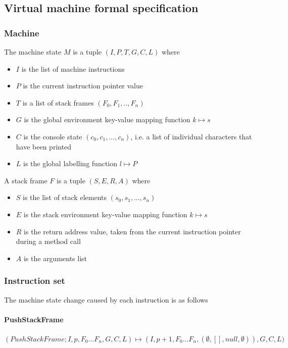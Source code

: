 \subsection{Virtual machine formal specification}

\subsubsection{Machine}

The machine state $M$ is a tuple $(I, P, T, G, C, L)$ where
\begin{itemize}
\item $I$ is the list of machine instructions
\item $P$ is the current instruction pointer value
\item $T$ is a list of stack frames $(F_0, F_1, .., F_n)$
\item $G$ is the global environment key-value mapping function $k \mapsto s$
\item $C$ is the console state $(c_0, c_1, ..., c_n)$, i.e. a list of individual characters that have been printed
\item $L$ is the global labelling function $l \mapsto P$
\end{itemize}

A stack frame $F$ is a tuple $(S, E, R, A)$ where
\begin{itemize}
\item $S$ is the list of stack elements $(s_0, s_1, ..., s_n)$
\item $E$ is the stack environment key-value mapping function $k \mapsto s$
\item $R$ is the return address value, taken from the current instruction pointer during a method call
\item $A$ is the arguments list
\end{itemize}

\subsubsection{Instruction set}

The machine state change caused by each instruction is as follows

\paragraph{PushStackFrame}

$(PushStackFrame; I, p, F_0...F_n, G, C, L) \mapsto (I, p+1, F_0...F_n, (\emptyset, [], null, \emptyset)), G, C, L)$

